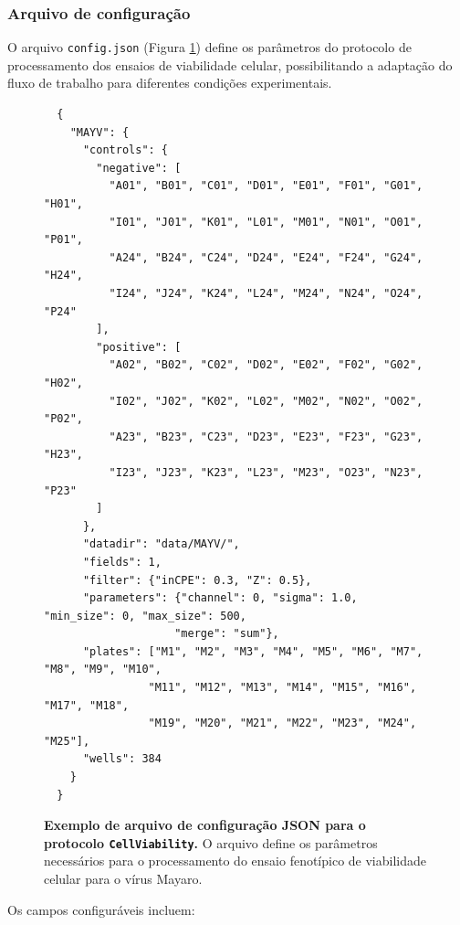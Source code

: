 \documentclass[12pt]{article}
\begin{document}
\subsubsection{Arquivo de configuração}

O arquivo \texttt{config.json} (Figura \ref{fig:json-example}) define os parâmetros do protocolo de processamento dos ensaios de viabilidade celular, possibilitando a adaptação do fluxo de trabalho para diferentes condições experimentais.

\begin{figure}[h]
  \begin{verbatim}
  {
    "MAYV": {
      "controls": {
        "negative": [
          "A01", "B01", "C01", "D01", "E01", "F01", "G01", "H01",
          "I01", "J01", "K01", "L01", "M01", "N01", "O01", "P01",
          "A24", "B24", "C24", "D24", "E24", "F24", "G24", "H24",
          "I24", "J24", "K24", "L24", "M24", "N24", "O24", "P24"
        ],
        "positive": [
          "A02", "B02", "C02", "D02", "E02", "F02", "G02", "H02",
          "I02", "J02", "K02", "L02", "M02", "N02", "O02", "P02",
          "A23", "B23", "C23", "D23", "E23", "F23", "G23", "H23",
          "I23", "J23", "K23", "L23", "M23", "O23", "N23", "P23"
        ]
      },
      "datadir": "data/MAYV/",
      "fields": 1,
      "filter": {"inCPE": 0.3, "Z": 0.5},
      "parameters": {"channel": 0, "sigma": 1.0, "min_size": 0, "max_size": 500,
                    "merge": "sum"},
      "plates": ["M1", "M2", "M3", "M4", "M5", "M6", "M7", "M8", "M9", "M10",
                "M11", "M12", "M13", "M14", "M15", "M16", "M17", "M18",
                "M19", "M20", "M21", "M22", "M23", "M24", "M25"],
      "wells": 384
    }
  }
  \end{verbatim}
  \caption{\textbf{Exemplo de arquivo de configuração JSON para o protocolo \texttt{CellViability}.} O arquivo define os parâmetros necessários para o processamento do ensaio fenotípico de viabilidade celular para o vírus Mayaro.}
  \label{fig:json-example}
\end{figure}

Os campos configuráveis incluem:
\end{document}
